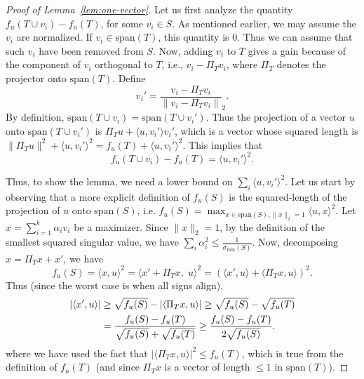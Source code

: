 \documentclass{article}
\newcommand{\Span}{\text{span}}
\newcommand{\norm}[1]{\lVert #1 \rVert}
\newcommand{\iprod}[1]{\langle #1 \rangle}
\begin{document}
\begin{proof}[Proof of Lemma~\ref{lem:one-vector}]
Let us first analyze the quantity $f_u(T \cup v_i) - f_u(T)$, for some $v_i \in S$.  As mentioned earlier, we may assume the $v_i$ are normalized. If $v_i \in \Span(T)$, this quantity is $0$. Thus we can assume that such $v_i$ have been removed from $S$. Now, adding $v_i$ to $T$ gives a gain because of the component of $v_i$ orthogonal to $T$, i.e., $v_i - \Pi_T v_i$, where $\Pi_T$ denotes the projector onto $\Span(T)$. Define
\[ v_i' = \frac{v_i - \Pi_T v_i}{\norm{v_i - \Pi_T v_i}}_2.\] By definition, $\Span(T \cup v_i) = \Span(T \cup v_i')$. Thus the projection of a vector $u$ onto $\Span(T \cup v_i')$ is $\Pi_T u + \iprod{u, v_i'} v_i'$, which is a vector whose squared length is
$\norm{\Pi_T u}^2 + \iprod{u, v_i'}^2 = f_u(T) + \iprod{u, v_i'}^2$.
This implies that
\begin{equation}\label{eq:gain-single}
f_u(T \cup v_i ) - f_u(T) = \iprod{u, v_i'}^2.
\end{equation}

Thus, to show the lemma, we need a lower bound on $\sum_i \iprod{u, v_i'}^2$. Let us start by observing
that a more explicit definition of $f_u(S)$ is the squared-length of the projection of $u$ onto $\Span(S)$, i.e. $f_u(S) = \max_{x \in \Span(S), \norm{x}_2 = 1} \iprod{u, x}^2$. Let $x = \sum_{i=1}^k \alpha_i v_i$ be a maximizer. Since $\norm{x}_2=1$, by the definition of the smallest squared singular value, we have $\sum_i \alpha_i^2 \le \frac{1}{\sigma_{\min}(S)}$.  Now, decomposing $x = \Pi_T x + x'$, we have
\[ f_u(S) =  \langle x, u \rangle^2  
= \langle x' + \Pi_T x, \; u \rangle^2 
= (\langle x', u \rangle + \langle \Pi_T x, u \rangle)^2.\]
Thus (since the worst case is when all signs align),
\begin{align}
|\iprod{ x', u}| &\ge \sqrt{f_u(S)} - |\langle \Pi_T x, u \rangle| \ge \sqrt{f_u(S)} - \sqrt{f_u(T)} \notag \\ &= \frac{f_u(S) - f_u(T)}{\sqrt{f_u(S)}+ \sqrt{f_u(T)}} \ge \frac{f_u(S) - f_u(T)}{2\sqrt{f_u(S)}}. \label{eq:dotprod-lb2}
\end{align}
where we have used the fact that $|\iprod{\Pi_T x, u}|^2 \le f_u(T)$, which is true from the definition of $f_u(T)$ (and since $\Pi_T x$ is a vector of length $\le 1$ in $\Span(T)$). 


\end{proof}
\end{document}
